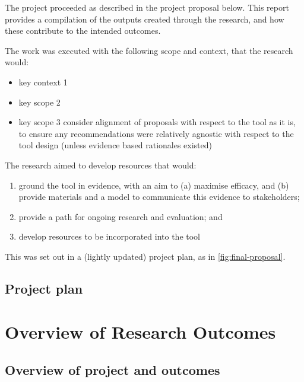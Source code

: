 \documentclass[
]{book}
\providecommand{\tightlist}{%
  \setlength{\itemsep}{0pt}\setlength{\parskip}{0pt}}
\begin{document}
The project proceeded as described in the project proposal below. This report provides a compilation of the outputs created through the research, and how these contribute to the intended outcomes.

The work was executed with the following scope and context, that the research would:

\begin{itemize}
\tightlist
\item
  key context 1
\item
  key scope 2
\item
  key scope 3 consider alignment of proposals with respect to the tool as it is, to ensure any recommendations were relatively agnostic with respect to the tool design (unless evidence based rationales existed)
\end{itemize}

The research aimed to develop resources that would:

\begin{enumerate}
\def\labelenumi{\arabic{enumi}.}
\tightlist
\item
  ground the tool in evidence, with an aim to (a) maximise efficacy, and (b) provide materials and a model to communicate this evidence to stakeholders;
\item
  provide a path for ongoing research and evaluation; and
\item
  develop resources to be incorporated into the tool
\end{enumerate}

This was set out in a (lightly updated) project plan, as in \ref{fig:final-proposal}.

\hypertarget{project-plan}{%
\section{Project plan}\label{project-plan}}

\label{fig:final-proposal}

\hypertarget{overview}{%
\chapter{Overview of Research Outcomes}\label{overview}}

\hypertarget{overview-of-project-and-outcomes}{%
\section{Overview of project and outcomes}\label{overview-of-project-and-outcomes}}
\end{document}
